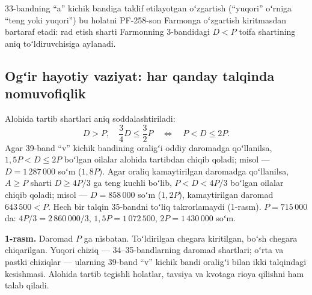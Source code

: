 \documentclass[12pt,a4paper]{extarticle}
\begin{document}
33-bandning “a” kichik bandiga taklif etilayotgan oʻzgartish (“yuqori” oʻrniga “teng yoki yuqori”) bu holatni PF-258-son Farmonga oʻzgartish kiritmasdan bartaraf etadi: rad etish sharti Farmonning 3-bandidagi $D<P$ toifa shartining aniq toʻldiruvchisiga aylanadi.

\subsection{Ogʻir hayotiy vaziyat: har qanday talqinda nomuvofiqlik}
Alohida tartib shartlari aniq soddalashtiriladi:
\begin{equation}
D>P,\quad\frac34D\le\frac32P\quad\Longleftrightarrow\quad P<D\le2P.
\end{equation}
Agar 39-band “v” kichik bandining oraligʻi oddiy daromadga qoʻllanilsa, $1{,}5P<D\le2P$ boʻlgan oilalar alohida tartibdan chiqib qoladi; misol — $D=1\,287\,000$ soʻm ($1{,}8P$). Agar oraliq kamaytirilgan daromadga qoʻllanilsa, $A\ge P$ sharti $D\ge4P/3$ ga teng kuchli boʻlib, $P<D<4P/3$ boʻlgan oilalar chiqib qoladi; misol — $D=858\,000$ soʻm ($1{,}2P$), kamaytirilgan daromad $643\,500<P$. Hech bir talqin 35-bandni toʻliq takrorlamaydi (1-rasm). $P=715\,000$ da: $4P/3=2\,860\,000/3$, $1{,}5P=1\,072\,500$, $2P=1\,430\,000$ soʻm.

\begin{center}
\end{center}
\textbf{1-rasm.} Daromad $P$ ga nisbatan. Toʻldirilgan chegara kiritilgan, boʻsh chegara chiqarilgan. Yuqori chiziq — 34–35-bandlarning daromad shartlari; oʻrta va pastki chiziqlar — ularning 39-band “v” kichik bandi oraligʻi bilan ikki talqindagi kesishmasi. Alohida tartib tegishli holatlar, tavsiya va kvotaga rioya qilishni ham talab qiladi.
\end{document}
